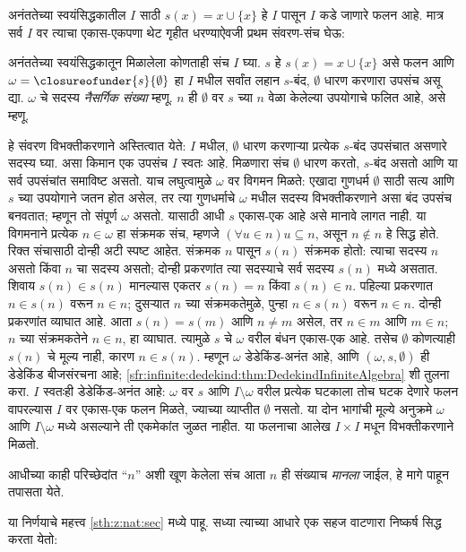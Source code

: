 अनंततेच्या स्वयंसिद्धकातील $I$ साठी $s(x)=x\cup\{x\}$ हे
$I$ पासून $I$ कडे जाणारे फलन आहे. मात्र सर्व $I$ वर त्याचा
एकास-एकपणा थेट गृहीत धरण्याऐवजी प्रथम संवरण-संच घेऊ:
\begin{defn}\label{sth:z:infinity-again:defnomega}
अनंततेच्या स्वयंसिद्धकातून मिळालेला कोणताही संच $I$ घ्या.
$s$ हे $s(x)=x\cup\{x\}$ असे फलन आणि
$\omega=\closureofunder{s}{\emptyset}$ हा $I$ मधील सर्वांत लहान
$s$-बंद, $\emptyset$ धारण करणारा उपसंच असू द्या.
$\omega$ चे सदस्य \emph{नैसर्गिक संख्या} म्हणू.
$n$ ही $\emptyset$ वर $s$ च्या $n$ वेळा केलेल्या उपयोगाचे फलित आहे,
असे म्हणू.
\end{defn}
हे संवरण विभक्तीकरणाने अस्तित्वात येते: $I$ मधील,
$\emptyset$ धारण करणाऱ्या प्रत्येक $s$-बंद उपसंचात असणारे सदस्य घ्या.
असा किमान एक उपसंच $I$ स्वतः आहे. मिळणारा संच
$\emptyset$ धारण करतो, $s$-बंद असतो आणि या सर्व उपसंचांत समाविष्ट असतो.
याच लघुत्वामुळे $\omega$ वर विगमन मिळते: एखादा गुणधर्म
$\emptyset$ साठी सत्य आणि $s$ च्या उपयोगाने जतन होत असेल,
तर त्या गुणधर्माचे $\omega$ मधील सदस्य विभक्तीकरणाने
असा बंद उपसंच बनवतात; म्हणून तो संपूर्ण $\omega$ असतो.
यासाठी आधी $s$ एकास-एक आहे असे मानावे लागत नाही.
या विगमनाने प्रत्येक $n\in\omega$ हा संक्रमक संच,
म्हणजे $(\forall u\in n)u\subseteq n$, असून $n\notin n$ हे सिद्ध होते.
रिक्त संचासाठी दोन्ही अटी स्पष्ट आहेत.
संक्रमक $n$ पासून $s(n)$ संक्रमक होतो: त्याचा सदस्य
$n$ असतो किंवा $n$ चा सदस्य असतो; दोन्ही प्रकरणांत
त्या सदस्याचे सर्व सदस्य $s(n)$ मध्ये असतात.
शिवाय $s(n)\in s(n)$ मानल्यास एकतर $s(n)=n$ किंवा $s(n)\in n$.
पहिल्या प्रकरणात $n\in s(n)$ वरून $n\in n$;
दुसऱ्यात $n$ च्या संक्रमकतेमुळे, पुन्हा $n\in s(n)$ वरून $n\in n$.
दोन्ही प्रकरणांत व्याघात आहे.
आता $s(n)=s(m)$ आणि $n\neq m$ असेल, तर
$n\in m$ आणि $m\in n$; $n$ च्या संक्रमकतेने $n\in n$,
हा व्याघात. त्यामुळे $s$ चे $\omega$ वरील बंधन एकास-एक आहे.
तसेच $\emptyset$ कोणत्याही $s(n)$ चे मूल्य नाही,
कारण $n\in s(n)$. म्हणून $\omega$ डेडेकिंड-अनंत आहे,
आणि $(\omega,s,\emptyset)$ ही डेडेकिंड बीजसंरचना आहे;
\ref{sfr:infinite:dedekind:thm:DedekindInfiniteAlgebra}
शी तुलना करा. $I$ स्वतःही डेडेकिंड-अनंत आहे:
$\omega$ वर $s$ आणि $I\setminus\omega$ वरील प्रत्येक घटकाला तोच घटक देणारे फलन वापरल्यास
$I$ वर एकास-एक फलन मिळते, ज्याच्या व्याप्तीत $\emptyset$ नसतो. या दोन भागांची मूल्ये अनुक्रमे $\omega$ आणि
$I\setminus\omega$ मध्ये असल्याने ती एकमेकांत जुळत नाहीत.
या फलनाचा आलेख $I\times I$ मधून विभक्तीकरणाने मिळतो.

आधीच्या काही परिच्छेदांत ``$n$'' अशी खूण केलेला संच आता $n$ ही संख्याच \emph{मानला} जाईल, हे मागे पाहून तपासता येते.

या निर्णयाचे महत्त्व \ref{sth:z:nat:sec} मध्ये पाहू. सध्या त्याच्या आधारे एक सहज वाटणारा निष्कर्ष सिद्ध करता येतो:

